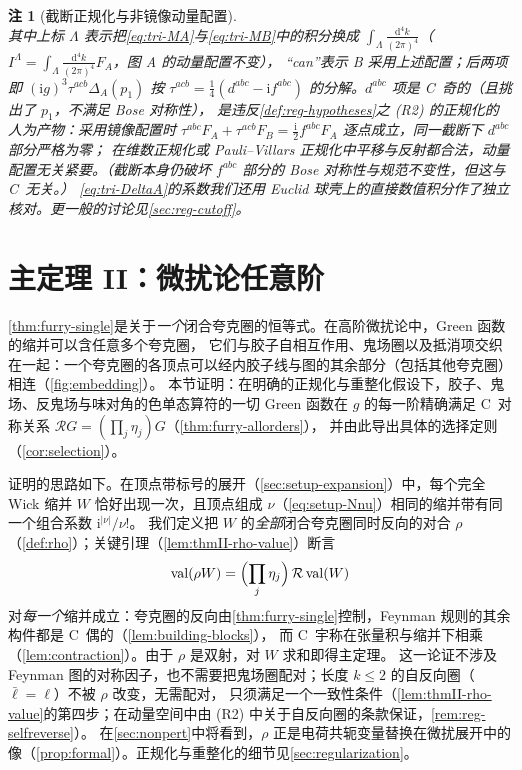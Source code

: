 \documentclass[UTF8,a4paper,11pt,fontset=fandol]{ctexart}
\theoremstyle{cplain}
\theoremstyle{cdefinition}
\theoremstyle{cremark}
\newtheorem{remark}[theorem]{注}
\numberwithin{equation}{section}
\newcommand{\dd}{\mathrm{d}}                         %
\newcommand{\Rop}{\mathcal{R}}                       %
\newcommand{\ii}{\mathrm{i}}                        %
\begin{document}
\begin{remark}[截断正规化与非镜像动量配置]
\begin{equation}
\end{equation}
其中上标 $\Lambda$ 表示把\cref{eq:tri-MA}与\cref{eq:tri-MB}中的积分换成 $\int_\Lambda\frac{\dd^4k}{(2\pi)^4}$（$I^\Lambda=\int_\Lambda\frac{\dd^4k}{(2\pi)^4}F_A$，图 A 的动量配置不变），
“can”表示 B 采用上述配置；后两项即 $(\ii g)^3\tau^{acb}\Delta_A(p_1)$ 按 $\tau^{acb}=\frac14(d^{abc}-\ii f^{abc})$ 的分解。$d^{abc}$ 项是 C~奇的（且挑出了 $p_1$，不满足 Bose 对称性），
是违反\cref{def:reg-hypotheses}之 (R2) 的正规化的人为产物：采用镜像配置时 $\tau^{abc}F_A+\tau^{acb}F_B=\frac{\ii}{2}f^{abc}F_A$ 逐点成立，同一截断下 $d^{abc}$ 部分严格为零；
在维数正规化或 Pauli--Villars 正规化中平移与反射都合法，动量配置无关紧要。（截断本身仍破坏 $f^{abc}$ 部分的 Bose 对称性与规范不变性，但这与 C~无关。）
\cref{eq:tri-DeltaA}的系数我们还用 Euclid 球壳上的直接数值积分作了独立核对。更一般的讨论见\cref{sec:reg-cutoff}。
\end{remark}

\section{主定理 II：微扰论任意阶}\label{sec:thmII}

\cref{thm:furry-single}是关于\emph{一个}闭合夸克圈的恒等式。在高阶微扰论中，Green 函数的缩并可以含任意多个夸克圈，
它们与胶子自相互作用、鬼场圈以及抵消项交织在一起：一个夸克圈的各顶点可以经内胶子线与图的其余部分（包括其他夸克圈）相连（\cref{fig:embedding}）。
本节证明：在明确的正规化与重整化假设下，胶子、鬼场、反鬼场与味对角的色单态算符的一切 Green 函数在 $g$ 的每一阶精确满足 C~对称关系 $\Rop G=(\prod_j\eta_j)G$（\cref{thm:furry-allorders}），
并由此导出具体的选择定则（\cref{cor:selection}）。

证明的思路如下。在顶点带标号的展开（\cref{sec:setup-expansion}）中，每个完全 Wick 缩并 $W$ 恰好出现一次，且顶点组成 $\nu$（\cref{eq:setup-Nnu}）相同的缩并带有同一个组合系数 $\ii^{|\nu|}/\nu!$。
我们定义把 $W$ 的\emph{全部}闭合夸克圈同时反向的对合 $\rho$（\cref{def:rho}）；关键引理（\cref{lem:thmII-rho-value}）断言
\[
\operatorname{val}(\rho W)=\Bigl(\prod_j\eta_j\Bigr)\,\Rop\operatorname{val}(W)
\]
对\emph{每一个}缩并成立：夸克圈的反向由\cref{thm:furry-single}控制，Feynman 规则的其余构件都是 C~偶的（\cref{lem:building-blocks}），
而 C~宇称在张量积与缩并下相乘（\cref{lem:contraction}）。由于 $\rho$ 是双射，对 $W$ 求和即得主定理。
这一论证不涉及 Feynman 图的对称因子，也不需要把鬼场圈配对；长度 $k\le2$ 的自反向圈（$\bar\ell=\ell$）不被 $\rho$ 改变，无需配对，
只须满足一个一致性条件（\cref{lem:thmII-rho-value}的第四步；在动量空间中由 (R2) 中关于自反向圈的条款保证，\cref{rem:reg-selfreverse}）。
在\cref{sec:nonpert}中将看到，$\rho$ 正是电荷共轭变量替换在微扰展开中的像（\cref{prop:formal}）。正规化与重整化的细节见\cref{sec:regularization}。
\end{document}
